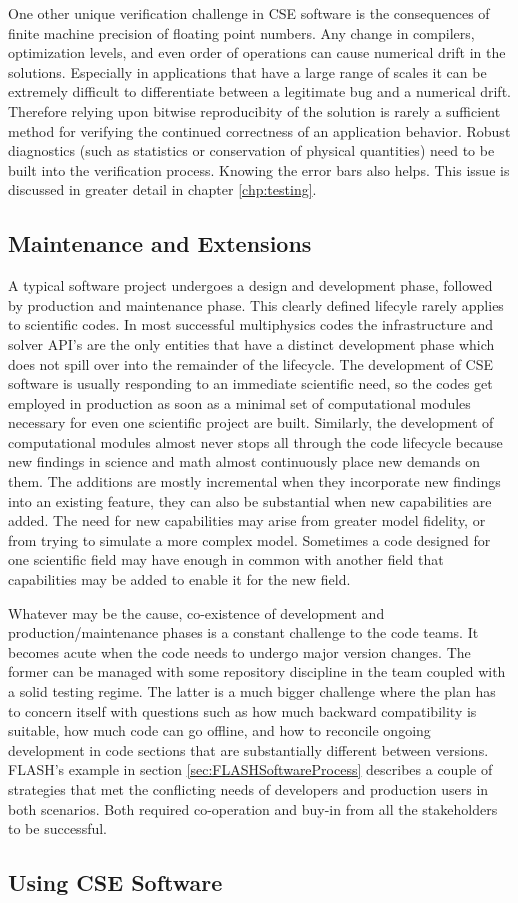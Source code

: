 One other unique verification challenge in CSE software is the
consequences of finite machine precision of floating point
numbers. Any change in compilers, optimization levels, and even order
of operations can cause numerical drift in the solutions. Especially
in applications that have a large range of scales it can be extremely
difficult to differentiate between a legitimate bug and a numerical
drift. Therefore relying upon bitwise reproducibity of the solution is
rarely a sufficient method for verifying the continued correctness of
an application behavior. Robust diagnostics (such as statistics or
conservation of physical quantities) need to be built into the
verification process. Knowing the error bars also helps. This issue is
discussed in greater detail in chapter \ref{chp:testing}.

\subsection{Maintenance and Extensions}
\label{sec:maintain}
A typical software project undergoes a design and development phase,
followed by production and maintenance phase. This clearly
defined lifecyle rarely applies to scientific codes. In most successful multiphysics
codes the infrastructure and solver API's are the only entities that
have a distinct development phase which does not spill over into the
remainder of the lifecycle.  The development of CSE software is
usually responding to an immediate scientific need, so the codes get
employed in production as soon as a minimal set of computational
modules necessary for even one scientific project are
built. Similarly, the development of computational modules almost
never stops all through the code lifecycle because new findings in science
and math almost continuously place new demands on them. The additions
are mostly incremental when they incorporate new findings into an
existing feature, they can also be substantial when new capabilities
are added. The need for new capabilities may arise from 
greater model fidelity, or from trying to simulate a more complex
model. Sometimes a code designed for one scientific field may have
enough in common with another field that capabilities may be added to
enable it for the new field.   

Whatever may be the cause, co-existence of development and
production/maintenance phases is a constant challenge to the code
teams. It becomes acute when the code needs to undergo major version
changes. The former can be managed with some repository
discipline in the team coupled with a solid testing regime. The latter
is a much bigger challenge where the plan has to concern itself with
questions such as how much backward compatibility is suitable, how
much code can go offline, and how to reconcile ongoing development in
code sections that are substantially different between versions.
FLASH's example in section \ref{sec:FLASHSoftwareProcess} describes
a couple of strategies that met the conflicting needs of developers and
production users in both scenarios. Both required co-operation and
buy-in from all the stakeholders to be successful. 

\subsection{Using CSE Software}

